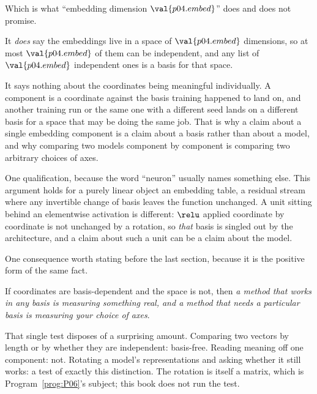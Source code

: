 \begin{fr}
\begin{aibox}
Which is what \enquote{embedding dimension $\val{p04.embed}$} does and does not
promise.

It \emph{does} say the embeddings live in a space of $\val{p04.embed}$
dimensions, so at most $\val{p04.embed}$ of them can be independent, and any
list of $\val{p04.embed}$ independent ones is a basis for that space.

It says nothing about the coordinates being meaningful individually. A
component is a coordinate against the basis training happened to land on, and
another training run \dash{} or the same one with a different seed \dash{} lands
on a different basis for a space that may be doing the same job. That is why a
claim about a single embedding component is a claim about a basis rather than
about a model, and why comparing two models component by component is comparing
two arbitrary choices of axes.

One qualification, because the word \enquote{neuron} usually names something
else. This argument holds for a purely linear object \dash{} an embedding
table, a residual stream \dash{} where any invertible change of basis leaves
the function unchanged. A unit sitting behind an elementwise activation is
different: $\relu$ applied coordinate by coordinate is not unchanged by a
rotation, so \emph{that} basis is singled out by the architecture, and a claim
about such a unit can be a claim about the model.
\end{aibox}
\end{fr}

\begin{fr}
One consequence worth stating before the last section, because it is the
positive form of the same fact.

If coordinates are basis-dependent and the space is not, then \emph{a method
that works in any basis is measuring something real, and a method that needs a
particular basis is measuring your choice of axes}.

That single test disposes of a surprising amount. Comparing two vectors by
length or by whether they are independent: basis-free. Reading meaning off one
component: not. Rotating a model's representations and asking whether it still
works: a test of exactly this distinction. The rotation is itself a matrix,
which is Program~\ref{prog:P06}'s subject; this book does not run the test.
\end{fr}

